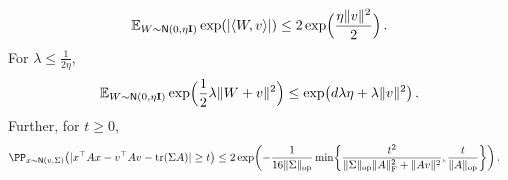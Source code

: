 \begin{lemma}\label{lem:Gaussian-vMGF}
\begin{align*}
    \En_{W\sim \normal{0,\eta\Id}} \exp\prn*{\abs{\tri{W,v}}}\leq 2\exp\prn[\Big]{\frac{\eta\nrm{v}^2}{2}}\,.
\end{align*}
For $\lambda\leq \frac{1}{2\eta}$,
\begin{align*}
    \En_{W\sim \normal{0,\eta\Id}} \exp\prn[\Big]{\frac12\lambda\nrm{W+v}^2}\leq \exp\prn[\big]{d\lambda \eta+\lambda\nrm{v}^2}\,.
\end{align*}
Further, for $t\geq 0$,
\begin{align*}
    \PP_{x\sim \normal{v,\Sigma}}\prn*{\abs{x\tp Ax-v\tp A v-\tr(\Sigma A)}\geq t}&\leq 2\exp\prn*{ -\frac{1}{16\nrmop{\Sigma}}\min\crl*{\frac{t^2}{\nrmop{\Sigma}\nrmF{A}^2+\nrm{Av}^2}, \frac{t}{\nrmop{A}} }}\,.
\end{align*}
\end{lemma}
